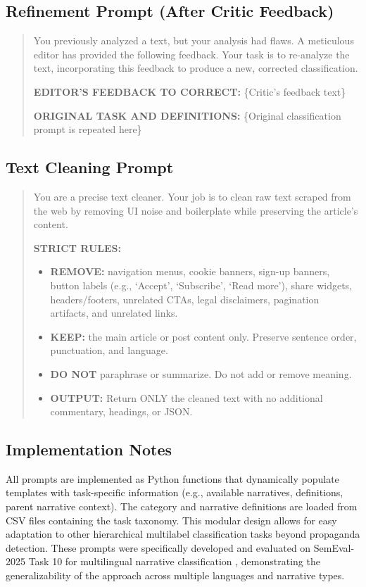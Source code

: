 \subsection{Refinement Prompt (After Critic Feedback)}

\begin{small}
\begin{quote}
You previously analyzed a text, but your analysis had flaws. A meticulous editor has provided the following feedback. Your task is to re-analyze the text, incorporating this feedback to produce a new, corrected classification.

\textbf{EDITOR'S FEEDBACK TO CORRECT:} \{Critic's feedback text\}

\textbf{ORIGINAL TASK AND DEFINITIONS:} \{Original classification prompt is repeated here\}
\end{quote}
\end{small}

\subsection{Text Cleaning Prompt}

\begin{small}
\begin{quote}
You are a precise text cleaner. Your job is to clean raw text scraped from the web by removing UI noise and boilerplate while preserving the article's content.

\textbf{STRICT RULES:}
\begin{itemize}
\item \textbf{REMOVE:} navigation menus, cookie banners, sign-up banners, button labels (e.g., `Accept', `Subscribe', `Read more'), share widgets, headers/footers, unrelated CTAs, legal disclaimers, pagination artifacts, and unrelated links.
\item \textbf{KEEP:} the main article or post content only. Preserve sentence order, punctuation, and language.
\item \textbf{DO NOT} paraphrase or summarize. Do not add or remove meaning.
\item \textbf{OUTPUT:} Return ONLY the cleaned text with no additional commentary, headings, or JSON.
\end{itemize}
\end{quote}
\end{small}

\subsection{Implementation Notes}

All prompts are implemented as Python functions that dynamically populate templates with task-specific information (e.g., available narratives, definitions, parent narrative context). The category and narrative definitions are loaded from CSV files containing the task taxonomy. This modular design allows for easy adaptation to other hierarchical multilabel classification tasks beyond propaganda detection. These prompts were specifically developed and evaluated on SemEval-2025 Task 10 for multilingual narrative classification \citep{semeval2025task10}, demonstrating the generalizability of the approach across multiple languages and narrative types.
